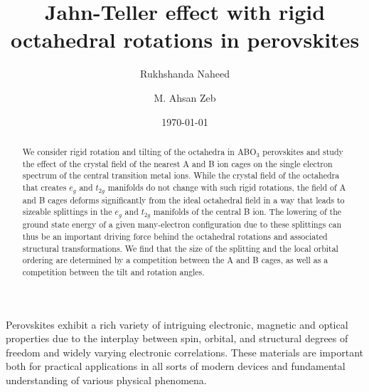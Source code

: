 \documentclass[a4paper,prb,twocolumn]{revtex4-1}  %
\begin{document}
\title{Jahn-Teller effect with rigid octahedral rotations in perovskites} %


\author{Rukhshanda Naheed}

\author{M. Ahsan Zeb}

\date{\today}
\begin{abstract}


We consider
rigid rotation and tilting of the 
octahedra
 in ABO$_3$ perovskites
and study the
effect of the crystal field of the nearest A and B ion cages 
on the single electron spectrum of the 
central 
transition metal ions.
While the crystal field of the octahedra 
that 
creates $e_g$ and $t_{2g}$ manifolds
do not change with such rigid rotations, 
the field of 
A and B cages
deforms significantly %
from the ideal octahedral field
in a way that
leads to sizeable splittings in the $e_g$ and $t_{2g}$ manifolds of the central B ion.
The lowering of the ground state energy
of a given many-electron configuration
due to these splittings
can thus be an important driving force behind the octahedral rotations 
and associated structural transformations.
We find that the size of the splitting and the local orbital ordering are
determined by a competition between the A and B cages, 
as well as a competition between the tilt and rotation angles.

\end{abstract}
\maketitle



Perovskites  
exhibit a rich variety of intriguing 
electronic, magnetic and optical properties
due to the interplay between
spin, orbital, and structural degrees of freedom
and widely varying electronic correlations.
These materials 
are important
both for practical applications in all sorts of modern devices 
and 
fundamental understanding of various physical phenomena.
\end{document}
